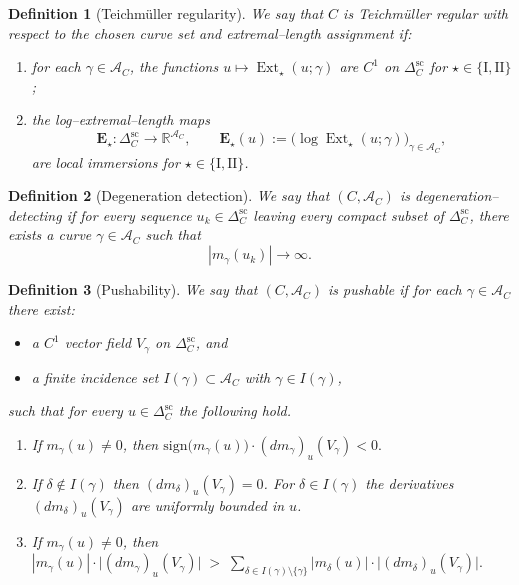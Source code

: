 \documentclass[10pt,a4paper]{amsart}
\newtheorem{definition}{Definition}
\DeclareMathOperator{\Ext}{Ext}
\newcommand{\R}{\mathbb{R}}
\begin{document}
\begin{definition}[Teichm\"uller regularity]\label{def:TeichReg}
We say that $C$ is \emph{Teichm\"uller regular} with respect to the chosen curve set and extremal--length assignment if:
\begin{enumerate}[label=\textup{(R\arabic*)}, leftmargin=2.8em]
\item for each $\gamma\in\mathcal A_C$, the functions $u\longmapsto \Ext_{\star}(u;\gamma)$ are $C^1$ on $\Delta_C^{\mathrm{sc}}$ for
$\star\in\{\mathrm{I},\mathrm{II}\}$;
\item the log--extremal--length maps
\[
\mathbf{E}_{\star}:\Delta_C^{\mathrm{sc}}\longrightarrow \R^{\mathcal A_C},\qquad
\mathbf{E}_{\star}(u):=\bigl(\log \Ext_{\star}(u;\gamma)\bigr)_{\gamma\in\mathcal A_C},
\]
are local immersions for $\star\in\{\mathrm{I},\mathrm{II}\}$.
\end{enumerate}
\end{definition}

\begin{definition}[Degeneration detection]\label{def:DegDetect}
We say that $(C,\mathcal A_C)$ is \emph{degeneration--detecting} if for every sequence
$u_k\in\Delta_C^{\mathrm{sc}}$ leaving every compact subset of $\Delta_C^{\mathrm{sc}}$, there exists a curve
$\gamma\in\mathcal A_C$ such that
\[
|m_\gamma(u_k)|\longrightarrow\infty .
\]
\end{definition}

\begin{definition}[Pushability]\label{def:Pushable}
We say that $(C,\mathcal A_C)$ is \emph{pushable} if for each $\gamma\in\mathcal A_C$ there exist:
\begin{itemize}[leftmargin=2.2em]
\item a $C^1$ vector field $V_\gamma$ on $\Delta_C^{\mathrm{sc}}$, and
\item a finite incidence set $I(\gamma)\subset \mathcal A_C$ with $\gamma\in I(\gamma)$,
\end{itemize}
such that for every $u\in\Delta_C^{\mathrm{sc}}$ the following hold.
\begin{enumerate}[label=\textup{(P\arabic*)}, leftmargin=2.8em]
\item 
If $m_\gamma(u)\neq 0$, then
\(
\mathrm{sign}\bigl(m_\gamma(u)\bigr)\cdot (dm_\gamma)_u(V_\gamma) <0.
\)
\item 
If $\delta\notin I(\gamma)$ then $(dm_\delta)_u(V_\gamma)=0$. For $\delta\in I(\gamma)$ the derivatives
$(dm_\delta)_u(V_\gamma)$ are uniformly bounded in $u$.
\item 
If $m_\gamma(u)\neq 0$, then
\(
|m_\gamma(u)|\cdot\bigl|(dm_\gamma)_u(V_\gamma)\bigr|
\;>\;
\sum_{\delta\in I(\gamma)\setminus\{\gamma\}}
|m_\delta(u)|\cdot\bigl|(dm_\delta)_u(V_\gamma)\bigr|.
\)
\end{enumerate}
\end{definition}
\end{document}
